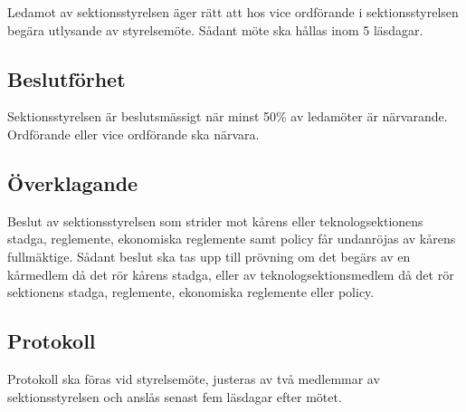 Ledamot av sektionsstyrelsen äger rätt att hos vice ordförande i sektionsstyrelsen begära utlysande av styrelsemöte.
Sådant möte ska hållas inom 5 läsdagar.
\subsection{Beslutförhet}
Sektionsstyrelsen är beslutsmässigt när minst 50\% av ledamöter är närvarande. Ordförande eller vice ordförande ska närvara.
\subsection{Överklagande}
Beslut av sektionsstyrelsen som strider mot kårens eller teknologsektionens stadga, reglemente, ekonomiska reglemente samt policy får undanröjas av kårens fullmäktige. Sådant beslut ska tas upp till prövning om det begärs av en kårmedlem då det rör kårens stadga, eller av teknologsektionsmedlem då det rör sektionens stadga, reglemente, ekonomiska reglemente eller policy.
\subsection{Protokoll}
Protokoll ska föras vid styrelsemöte, justeras av två medlemmar av sektionsstyrelsen och anslås senast fem läsdagar efter mötet.

